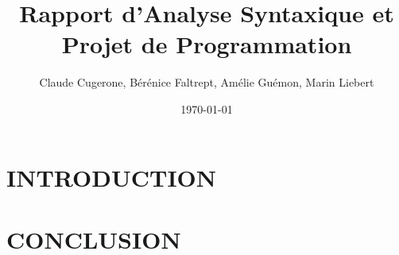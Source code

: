\documentclass[10pt,a4paper]{report}
\begin{document}
\title{Rapport d'Analyse Syntaxique et Projet de Programmation}

\date{\today}

\author{Claude Cugerone, Bérénice Faltrept, Amélie Guémon, Marin Liebert}

\section*{INTRODUCTION}

\section*{CONCLUSION}
\end{document}
